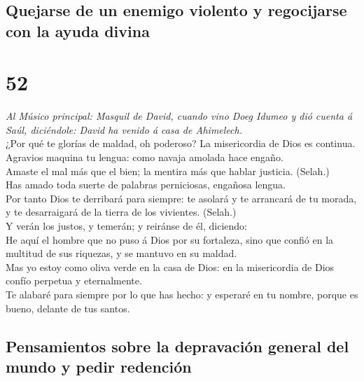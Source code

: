 \hypertarget{quejarse-de-un-enemigo-violento-y-regocijarse-con-la-ayuda-divina}{%
\subsection{Quejarse de un enemigo violento y regocijarse con la ayuda
divina}\label{quejarse-de-un-enemigo-violento-y-regocijarse-con-la-ayuda-divina}}

\hypertarget{section-51}{%
\section{52}\label{section-51}}

 \emph{Al Músico principal: Masquil de David, cuando vino
Doeg Idumeo y dió cuenta á Saúl, diciéndole: David ha venido á casa de
Ahimelech.}\\
¿Por qué te glorías de maldad, oh poderoso? La misericordia de Dios es
continua.\\
 Agravios maquina tu lengua: como navaja amolada hace
engaño.\\
 Amaste el mal más que el bien; la mentira más que hablar
justicia. (Selah.)\\
 Has amado toda suerte de palabras perniciosas, engañosa
lengua.\\
 Por tanto Dios te derribará para siempre: te asolará y te
arrancará de tu morada, y te desarraigará de la tierra de los vivientes.
(Selah.)\\
 Y verán los justos, y temerán; y reiránse de él,
diciendo:\\
 He aquí el hombre que no puso á Dios por su fortaleza, sino
que confió en la multitud de sus riquezas, y se mantuvo en su maldad.\\
 Mas yo estoy como oliva verde en la casa de Dios: en la
misericordia de Dios confío perpetua y eternalmente.\\
 Te alabaré para siempre por lo que has hecho: y esperaré en
tu nombre, porque es bueno, delante de tus santos.

\hypertarget{pensamientos-sobre-la-depravaciuxf3n-general-del-mundo-y-pedir-redenciuxf3n-1}{%
\subsection{Pensamientos sobre la depravación general del mundo y pedir
redención}\label{pensamientos-sobre-la-depravaciuxf3n-general-del-mundo-y-pedir-redenciuxf3n-1}}

